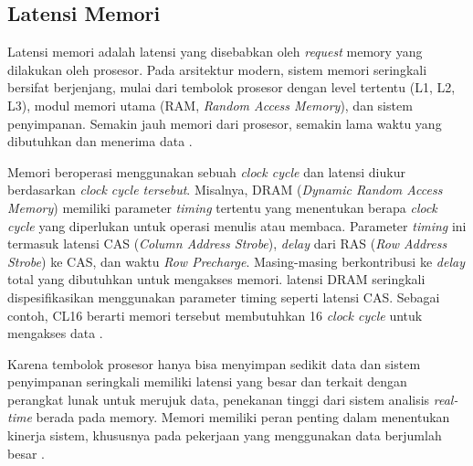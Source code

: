 \subsection{Latensi Memori}
\label{sec:latensi-memori}

Latensi memori adalah latensi yang disebabkan oleh \textit{request} memory yang dilakukan oleh prosesor. Pada arsitektur modern, sistem memori seringkali bersifat berjenjang, mulai dari tembolok prosesor dengan level tertentu (L1, L2, L3), modul memori utama (RAM, \textit{Random Access Memory}), dan sistem penyimpanan. Semakin jauh memori dari prosesor, semakin lama waktu yang dibutuhkan dan menerima data \parencite{hennessy2011computer}.

Memori beroperasi menggunakan sebuah \textit{clock cycle} dan latensi diukur berdasarkan \textit{clock cycle tersebut}. Misalnya, DRAM (\textit{Dynamic Random Access Memory}) memiliki parameter \textit{timing} tertentu yang menentukan berapa \textit{clock cycle} yang diperlukan untuk operasi menulis atau membaca. Parameter \textit{timing} ini termasuk latensi CAS (\textit{Column Address Strobe}), \textit{delay} dari RAS (\textit{Row Address Strobe}) ke CAS, dan waktu \textit{Row Precharge}. Masing-masing berkontribusi ke \textit{delay} total yang dibutuhkan untuk mengakses memori. latensi DRAM seringkali dispesifikasikan menggunakan parameter timing seperti latensi CAS. Sebagai contoh, CL16 berarti memori tersebut membutuhkan 16 \textit{clock cycle} untuk mengakses data \parencite{jacob2010memory}.

Karena tembolok prosesor hanya bisa menyimpan sedikit data dan sistem penyimpanan seringkali memiliki latensi yang besar dan terkait dengan perangkat lunak untuk merujuk data, penekanan tinggi dari sistem analisis \textit{real-time} berada pada memory. Memori memiliki peran penting dalam menentukan kinerja sistem, khususnya pada pekerjaan yang menggunakan data berjumlah besar \parencite{clapp2015quantifying}.
